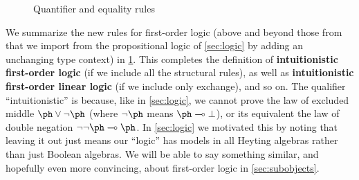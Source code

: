 
\begin{figure}
  \centering
  \caption{Quantifier and equality rules}
  \label{fig:fol}
\end{figure}

We summarize the new rules for first-order logic (above and beyond those from that we import from the propositional logic of \cref{sec:logic} by adding an unchanging type context) in \cref{fig:fol}.
This completes the definition of \textbf{intuitionistic first-order logic} (if we include all the structural rules), as well as \textbf{intuitionistic first-order linear logic} (if we include only exchange), and so on.
The qualifier ``intuitionistic'' is because, like in \cref{sec:logic}, we cannot prove the law of excluded middle $\ph\join\neg\ph$ (where $\neg\ph$ means $\ph\hom\bot$), or its equivalent the law of double negation $\neg\neg\ph\hom\ph$.
In \cref{sec:logic} we motivated this by noting that leaving it out just means our ``logic'' has models in all Heyting algebras rather than just Boolean algebras.
We will be able to say something similar, and hopefully even more convincing, about first-order logic in \cref{sec:subobjects}.

